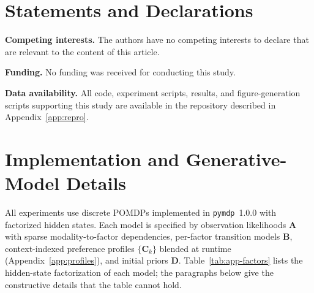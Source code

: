 \documentclass[10pt,twocolumn]{article}
\begin{document}
\section*{Statements and Declarations}

\textbf{Competing interests.} The authors have no competing interests to declare that are relevant to the content of this article.

\textbf{Funding.} No funding was received for conducting this study.

\textbf{Data availability.} All code, experiment scripts, results, and figure-generation scripts supporting this study are available in the repository described in Appendix~\ref{app:repro}.


 \appendix

\section{Implementation and Generative-Model Details}
\label{app:impl}

All experiments use discrete POMDPs implemented in \texttt{pymdp}~1.0.0 with factorized hidden states. Each model is specified by observation likelihoods $\mathbf{A}$ with sparse modality-to-factor dependencies, per-factor transition models $\mathbf{B}$, context-indexed preference profiles $\{\mathbf{C}_k\}$ blended at runtime (Appendix~\ref{app:profiles}), and initial priors $\mathbf{D}$. Table~\ref{tab:app-factors} lists the hidden-state factorization of each model; the paragraphs below give the constructive details that the table cannot hold.
\end{document}
